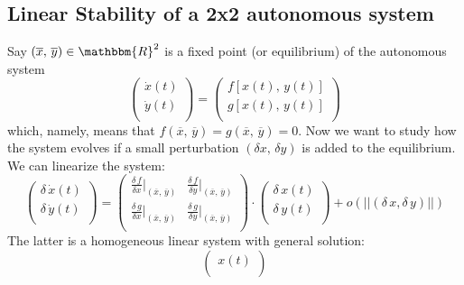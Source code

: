 \subsection*{Linear Stability of a 2x2 autonomous system}
\label{app:bifurcation_diagram}
{\small
Say $(\overline{x},\, \overline{y})\in \mathbbm{R}^2$ is a fixed point (or equilibrium) of the autonomous system 
\begin{equation*}
    \begin{pmatrix}
        \dot{x}(t) \\
        \dot{y}(t) \\
    \end{pmatrix}
    = 
        \begin{pmatrix}
        f[x(t),\, y(t)] \\
        g[x(t),\, y(t)] \\
    \end{pmatrix}
\end{equation*}
which, namely, means that $f(\overline{x},\, \overline{y}) = g(\overline{x},\, \overline{y}) = 0$. Now we want to study how the system evolves if a small perturbation $(\delta x,\, \delta y)$ is added to the equilibrium. We can linearize the system:
\begin{equation*}
    \begin{pmatrix}
        \delta\,\dot{x}(t) \\
        \delta\,\dot{y}(t) \\
    \end{pmatrix}
    = 
        \begin{pmatrix}
        \frac{\delta\,f}{\delta x}|_{(\overline{x},\,\overline{y})} & \frac{\delta\,f}{\delta y}|_{(\overline{x},\,\overline{y})}\\
        \frac{\delta\,g}{\delta x}|_{(\overline{x},\,\overline{y})} & \frac{\delta\,g}{\delta y}|_{(\overline{x},\,\overline{y})} \\
    \end{pmatrix}
    \cdot
        \begin{pmatrix}
        \delta\,x(t) \\
        \delta\,y(t) \\
    \end{pmatrix}
    +
    o(||(\delta\,x, \delta\,y)||)
\end{equation*}
 The latter is a homogeneous linear system with general solution:
\begin{equation*}
        \begin{pmatrix}
        x(t) \\

\end{pmatrix}
\end{equation*}}
